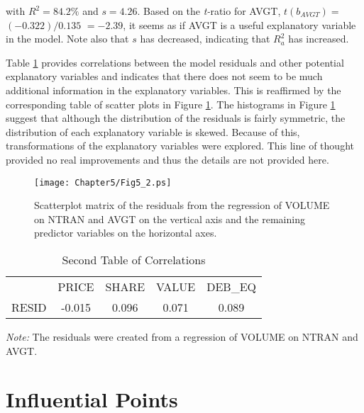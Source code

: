 \noindent with $R^{2}=84.2\%$ and $s=4.26$. Based on the
\textit{t-}ratio for AVGT, $t(b_{AVGT})=$ $(-0.322)/0.135$ $=-2.39$,
it seems as if AVGT is a useful explanatory variable in the model.
Note also that $s$ has decreased, indicating that $R_a^2$ has
increased.

Table \ref{T5:LiquidResidCorr2} provides correlations between the
model residuals and other potential explanatory variables and
indicates that there does not seem to be much additional information
in the explanatory variables. This is reaffirmed by the
corresponding table of scatter plots in Figure
\ref{F5:LiquidResidPlot}. The histograms in Figure
\ref{F5:LiquidResidPlot} suggest that although the distribution of
the residuals is fairly symmetric, the distribution of each
explanatory variable is skewed. Because of this, transformations of
the explanatory variables were explored. This line of thought
provided no real improvements and thus the details are not provided
here.

\begin{figure}[htp]
  \begin{center}
    \texttt{[image: Chapter5/Fig5\_2.ps]}
    \caption{\label{F5:LiquidResidPlot} \small  Scatterplot matrix of the
residuals from the regression of VOLUME on NTRAN and AVGT on the
vertical axis and the remaining predictor variables on the
horizontal axes.}
  \end{center}
\end{figure}



\begin{table}[h]

\caption{\label{T5:LiquidResidCorr2} Second Table of Correlations }
\begin{tabular}{ccccc}
\hline
& PRICE & SHARE & VALUE & DEB\_EQ \\
RESID & -0.015 & 0.096 & 0.071 & 0.089 \\ \hline
\end{tabular}

{\small \textit{Note:} The residuals were created from a regression
of VOLUME on NTRAN and AVGT.}  
\end{table}

\linejed

\section{Influential Points}

